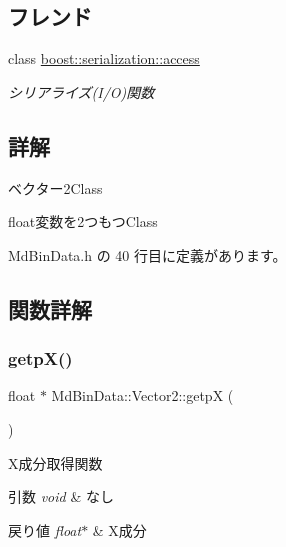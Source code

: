 \subsection*{フレンド}
\begin{DoxyCompactItemize}
\item 
class \mbox{\hyperlink{class_md_bin_data_1_1_vector2_ac98d07dd8f7b70e16ccb9a01abf56b9c}{boost\+::serialization\+::access}}
\begin{DoxyCompactList}\small\item\em シリアライズ(I/O)関数 \end{DoxyCompactList}\end{DoxyCompactItemize}


\subsection{詳解}
ベクター2\+Class 

float変数を2つもつ\+Class 

 Md\+Bin\+Data.\+h の 40 行目に定義があります。



\subsection{関数詳解}
\mbox{\label{class_md_bin_data_1_1_vector2_a6d45ff9158c5056f0b9555ee4cb68924}} 
\subsubsection{\texorpdfstring{getp\+X()}{getpX()}}
{\footnotesize\ttfamily float $\ast$ Md\+Bin\+Data\+::\+Vector2\+::getpX (\begin{DoxyParamCaption}{ }\end{DoxyParamCaption})}



X成分取得関数 


\begin{DoxyParams}{引数}
{\em void} & なし \\
\hline
\end{DoxyParams}

\begin{DoxyRetVals}{戻り値}
{\em float$\ast$} & X成分 \\
\hline
\end{DoxyRetVals}



